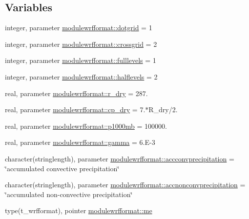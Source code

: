 \subsection*{Variables}
\begin{DoxyCompactItemize}
\item 
integer, parameter \mbox{\hyperlink{namespacemodulewrfformat_ae5346c607642bb08e89ac1ff57a740f1}{modulewrfformat\+::dotgrid}} = 1
\item 
integer, parameter \mbox{\hyperlink{namespacemodulewrfformat_a562cd5df35232824fd8cd4f0edda3921}{modulewrfformat\+::crossgrid}} = 2
\item 
integer, parameter \mbox{\hyperlink{namespacemodulewrfformat_ad275768ffc3918845d9acdd389b3ae46}{modulewrfformat\+::fulllevels}} = 1
\item 
integer, parameter \mbox{\hyperlink{namespacemodulewrfformat_a270e3c9e23ff9b3d0d5f35b0d60f8511}{modulewrfformat\+::halflevels}} = 2
\item 
real, parameter \mbox{\hyperlink{namespacemodulewrfformat_a2236075d1f043a07588786dffdfcf418}{modulewrfformat\+::r\+\_\+dry}} = 287.
\item 
real, parameter \mbox{\hyperlink{namespacemodulewrfformat_a7587eaf7b46174c3a6c5c0a5fd96d06c}{modulewrfformat\+::cp\+\_\+dry}} = 7.$\ast$R\+\_\+dry/2.
\item 
real, parameter \mbox{\hyperlink{namespacemodulewrfformat_a19972c1762f5019d8234d29fd8490039}{modulewrfformat\+::p1000mb}} = 100000.
\item 
real, parameter \mbox{\hyperlink{namespacemodulewrfformat_a7450ae50ccc588943891fd916a7fc713}{modulewrfformat\+::gamma}} = 6.\+E-\/3
\item 
character(stringlength), parameter \mbox{\hyperlink{namespacemodulewrfformat_ad1fc49a1e468e706f0718839d5abec25}{modulewrfformat\+::accconvprecipitation}} = \char`\"{}accumulated convective precipitation\char`\"{}
\item 
character(stringlength), parameter \mbox{\hyperlink{namespacemodulewrfformat_a13470954c6b6746858f10cce14718c6e}{modulewrfformat\+::accnonconvprecipitation}} = \char`\"{}accumulated non-\/convective precipitation\char`\"{}
\item 
type(t\+\_\+wrfformat), pointer \mbox{\hyperlink{namespacemodulewrfformat_ace240ee2fb9d24816a6fba3a2b6f9595}{modulewrfformat\+::me}}
\end{DoxyCompactItemize}

